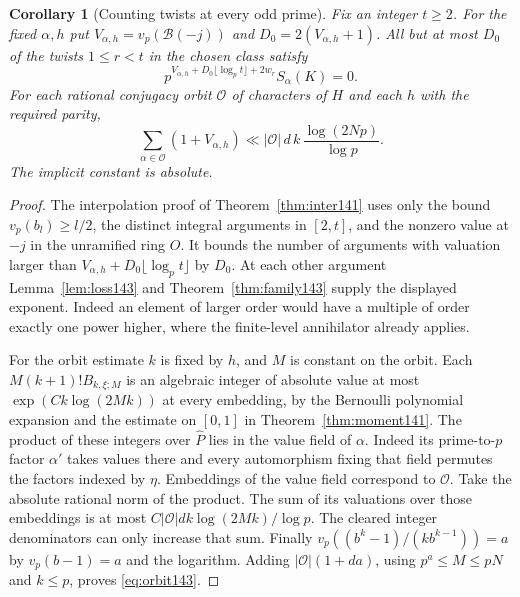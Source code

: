 \documentclass[a4paper,11pt]{article}
\newtheorem{corollary}[proposition]{Corollary}
\theoremstyle{definition}
\theoremstyle{remark}
\numberwithin{equation}{section}
\begin{document}
\begin{corollary}[Counting twists at every odd prime]\label{cor:family143}
Fix an integer \(t\ge2\). For the fixed \(\alpha,h\) put
\(V_{\alpha,h}=v_p(\mathcal B(-j))\) and \(D_0=2(V_{\alpha,h}+1)\).
All but at most \(D_0\) of the twists \(1\le r<t\) in the
chosen class satisfy
\[
     p^{V_{\alpha,h}+D_0\lfloor\log_p t\rfloor+2w_r}
                                                S_\alpha(K)=0 .
\]
For each rational conjugacy orbit \(\mathcal O\) of characters
of \(H\) and each \(h\) with the required parity,
\begin{equation}
 \sum_{\alpha\in\mathcal O}(1+V_{\alpha,h})
       \ll |\mathcal O|\,d\, k\,\frac{\log(2Np)}{\log p}.
 \label{eq:orbit143}
\end{equation}
The implicit constant is absolute.
\end{corollary}
\begin{proof}
The interpolation proof of Theorem~\ref{thm:inter141} uses only
the bound \(v_p(b_l)\ge l/2\), the distinct integral arguments
in \([2,t]\), and the nonzero value at \(-j\) in the unramified
ring \(O\). It bounds the number of arguments with valuation
larger than \(V_{\alpha,h}+D_0\lfloor\log_p t\rfloor\) by \(D_0\).
At each other argument Lemma~\ref{lem:loss143} and
Theorem~\ref{thm:family143} supply the displayed exponent.
Indeed an element of larger order would have a multiple of order
exactly one power higher, where the finite-level annihilator
already applies.

For the orbit estimate \(k\) is fixed by \(h\), and \(M\) is
constant on the orbit. Each
\(M(k+1)! B_{k,\xi;M}\) is an algebraic integer of absolute
value at most \(\exp(C k\log(2Mk))\) at every embedding, by
the Bernoulli polynomial expansion and the estimate on
\([0,1]\) in Theorem~\ref{thm:moment141}. The product of these
integers over \(\widehat P\) lies in the value field of \(\alpha\).
Indeed its prime-to-\(p\) factor \(\alpha'\) takes values there
and every automorphism fixing that field permutes the factors
indexed by \(\eta\). Embeddings of the value field correspond
to \(\mathcal O\). Take the absolute rational norm of the
product. The sum of its valuations over those embeddings is
at most \(C|\mathcal O|d k\log(2Mk)/\log p\). The cleared
integer denominators can only increase that sum. Finally
\(v_p((b^k-1)/(k b^{k-1}))=a\) by \(v_p(b-1)=a\) and the
logarithm. Adding \(|\mathcal O|(1+da)\), using \(p^a\le M\le pN\)
and \(k\le p\), proves \eqref{eq:orbit143}.
\end{proof}
\end{document}

